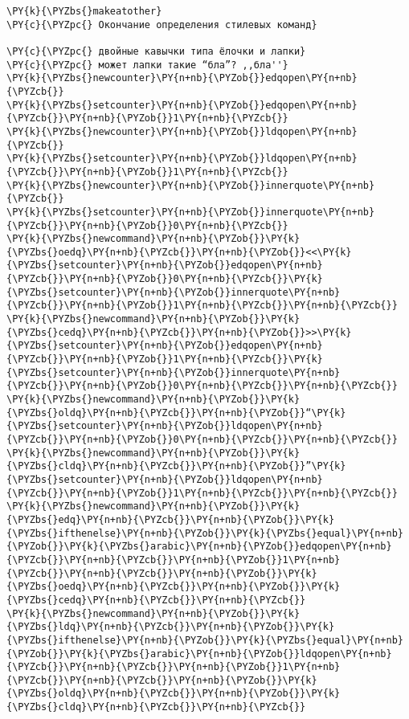 \begin{Verbatim}[commandchars=\\\{\}]
\PY{k}{\PYZbs{}makeatother}
\PY{c}{\PYZpc{} Окончание определения стилевых команд}

\PY{c}{\PYZpc{} двойные кавычки типа ёлочки и лапки}
\PY{c}{\PYZpc{} может лапки такие “бла”? ,,бла''}
\PY{k}{\PYZbs{}newcounter}\PY{n+nb}{\PYZob{}}edqopen\PY{n+nb}{\PYZcb{}}
\PY{k}{\PYZbs{}setcounter}\PY{n+nb}{\PYZob{}}edqopen\PY{n+nb}{\PYZcb{}}\PY{n+nb}{\PYZob{}}1\PY{n+nb}{\PYZcb{}}
\PY{k}{\PYZbs{}newcounter}\PY{n+nb}{\PYZob{}}ldqopen\PY{n+nb}{\PYZcb{}}
\PY{k}{\PYZbs{}setcounter}\PY{n+nb}{\PYZob{}}ldqopen\PY{n+nb}{\PYZcb{}}\PY{n+nb}{\PYZob{}}1\PY{n+nb}{\PYZcb{}}
\PY{k}{\PYZbs{}newcounter}\PY{n+nb}{\PYZob{}}innerquote\PY{n+nb}{\PYZcb{}}
\PY{k}{\PYZbs{}setcounter}\PY{n+nb}{\PYZob{}}innerquote\PY{n+nb}{\PYZcb{}}\PY{n+nb}{\PYZob{}}0\PY{n+nb}{\PYZcb{}}
\PY{k}{\PYZbs{}newcommand}\PY{n+nb}{\PYZob{}}\PY{k}{\PYZbs{}oedq}\PY{n+nb}{\PYZcb{}}\PY{n+nb}{\PYZob{}}<<\PY{k}{\PYZbs{}setcounter}\PY{n+nb}{\PYZob{}}edqopen\PY{n+nb}{\PYZcb{}}\PY{n+nb}{\PYZob{}}0\PY{n+nb}{\PYZcb{}}\PY{k}{\PYZbs{}setcounter}\PY{n+nb}{\PYZob{}}innerquote\PY{n+nb}{\PYZcb{}}\PY{n+nb}{\PYZob{}}1\PY{n+nb}{\PYZcb{}}\PY{n+nb}{\PYZcb{}}
\PY{k}{\PYZbs{}newcommand}\PY{n+nb}{\PYZob{}}\PY{k}{\PYZbs{}cedq}\PY{n+nb}{\PYZcb{}}\PY{n+nb}{\PYZob{}}>>\PY{k}{\PYZbs{}setcounter}\PY{n+nb}{\PYZob{}}edqopen\PY{n+nb}{\PYZcb{}}\PY{n+nb}{\PYZob{}}1\PY{n+nb}{\PYZcb{}}\PY{k}{\PYZbs{}setcounter}\PY{n+nb}{\PYZob{}}innerquote\PY{n+nb}{\PYZcb{}}\PY{n+nb}{\PYZob{}}0\PY{n+nb}{\PYZcb{}}\PY{n+nb}{\PYZcb{}}
\PY{k}{\PYZbs{}newcommand}\PY{n+nb}{\PYZob{}}\PY{k}{\PYZbs{}oldq}\PY{n+nb}{\PYZcb{}}\PY{n+nb}{\PYZob{}}“\PY{k}{\PYZbs{}setcounter}\PY{n+nb}{\PYZob{}}ldqopen\PY{n+nb}{\PYZcb{}}\PY{n+nb}{\PYZob{}}0\PY{n+nb}{\PYZcb{}}\PY{n+nb}{\PYZcb{}}
\PY{k}{\PYZbs{}newcommand}\PY{n+nb}{\PYZob{}}\PY{k}{\PYZbs{}cldq}\PY{n+nb}{\PYZcb{}}\PY{n+nb}{\PYZob{}}”\PY{k}{\PYZbs{}setcounter}\PY{n+nb}{\PYZob{}}ldqopen\PY{n+nb}{\PYZcb{}}\PY{n+nb}{\PYZob{}}1\PY{n+nb}{\PYZcb{}}\PY{n+nb}{\PYZcb{}}
\PY{k}{\PYZbs{}newcommand}\PY{n+nb}{\PYZob{}}\PY{k}{\PYZbs{}edq}\PY{n+nb}{\PYZcb{}}\PY{n+nb}{\PYZob{}}\PY{k}{\PYZbs{}ifthenelse}\PY{n+nb}{\PYZob{}}\PY{k}{\PYZbs{}equal}\PY{n+nb}{\PYZob{}}\PY{k}{\PYZbs{}arabic}\PY{n+nb}{\PYZob{}}edqopen\PY{n+nb}{\PYZcb{}}\PY{n+nb}{\PYZcb{}}\PY{n+nb}{\PYZob{}}1\PY{n+nb}{\PYZcb{}}\PY{n+nb}{\PYZcb{}}\PY{n+nb}{\PYZob{}}\PY{k}{\PYZbs{}oedq}\PY{n+nb}{\PYZcb{}}\PY{n+nb}{\PYZob{}}\PY{k}{\PYZbs{}cedq}\PY{n+nb}{\PYZcb{}}\PY{n+nb}{\PYZcb{}}
\PY{k}{\PYZbs{}newcommand}\PY{n+nb}{\PYZob{}}\PY{k}{\PYZbs{}ldq}\PY{n+nb}{\PYZcb{}}\PY{n+nb}{\PYZob{}}\PY{k}{\PYZbs{}ifthenelse}\PY{n+nb}{\PYZob{}}\PY{k}{\PYZbs{}equal}\PY{n+nb}{\PYZob{}}\PY{k}{\PYZbs{}arabic}\PY{n+nb}{\PYZob{}}ldqopen\PY{n+nb}{\PYZcb{}}\PY{n+nb}{\PYZcb{}}\PY{n+nb}{\PYZob{}}1\PY{n+nb}{\PYZcb{}}\PY{n+nb}{\PYZcb{}}\PY{n+nb}{\PYZob{}}\PY{k}{\PYZbs{}oldq}\PY{n+nb}{\PYZcb{}}\PY{n+nb}{\PYZob{}}\PY{k}{\PYZbs{}cldq}\PY{n+nb}{\PYZcb{}}\PY{n+nb}{\PYZcb{}}

\end{Verbatim}
